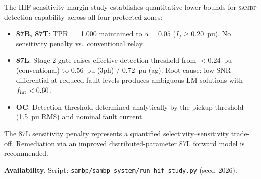 \documentclass[12pt,a4paper]{article}
\newcommand{\SAMBP}{\textsc{sambp}}
\newcommand{\fint}{f_{\rm int}}
\begin{document}
The HIF sensitivity margin study establishes quantitative lower
bounds for \SAMBP{} detection capability across all four protected zones:

\begin{itemize}
  \item \textbf{87B, 87T}: TPR~=~1.000 maintained to $\alpha = 0.05$
    ($I_f \geq 0.20$~pu).  No sensitivity penalty vs.\ conventional relay.

  \item \textbf{87L}: Stage-2 gate raises effective detection threshold
    from $< 0.24$~pu (conventional) to $0.56$~pu (3ph) / $0.72$~pu (ag).
    Root cause: low-SNR differential at reduced fault levels produces
    ambiguous LM solutions with $\fint < 0.60$.

  \item \textbf{OC}: Detection threshold determined analytically by the
    pickup threshold (1.5~pu RMS) and nominal fault current.
\end{itemize}

The 87L sensitivity penalty represents a quantified selectivity--sensitivity
trade-off.  Remediation via an improved distributed-parameter 87L forward
model is recommended.

\bigskip\noindent\textbf{Availability.}
Script: \texttt{sambp/sambp\_system/run\_hif\_study.py} (seed~2026).

\newpage


\end{document}
